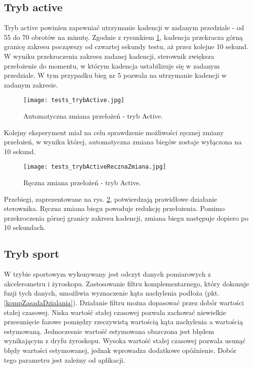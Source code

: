 \subsection{Tryb active}

Tryb active powinien zapewniać utrzymanie kadencji w zadanym przedziale - od 55 do 70 obrotów na minutę. Zgodnie z rysunkiem \ref{fig:tests_active}, kadencja przekracza górną granicę zakresu począwszy od czwartej sekundy testu, aż przez kolejne 10 sekund. W wyniku przekroczenia zakresu zadanej kadencji, sterownik zwiększa przełożenie do momentu, w którym kadencja ustabilizuje się w zadanym przedziale. W tym przypadku bieg nr 5 pozwala na utrzymanie kadencji w zadanym zakresie.
\begin{figure}[h]
    \centering
    \texttt{[image: tests\_trybActive.jpg]}
    \caption{Automatyczna zmiana przełożeń - tryb Active.}
    \label{fig:tests_active}
\end{figure}

Kolejny eksperyment miał na celu sprawdzenie możliwości ręcznej zmiany przełożeń, w wyniku której, automatyczna zmiana biegów zostaje wyłączona na 10 sekund.
\begin{figure}[h]
    \centering
    \texttt{[image: tests\_trybActiveRecznaZmiana.jpg]}
    \caption{Ręczna zmiana przełożeń - tryb Active.}
    \label{fig:tests_activeReczna}
\end{figure}

Przebiegi, zaprezentowane na rys. \ref{fig:tests_activeReczna}, potwierdzają prawidłowe działanie sterownika. Ręczna zmiana biegu powoduje redukcję przełożenia. Pomimo przekroczenia górnej granicy zakresu kadencji, zmiana biegu następuje dopiero po 10 sekundach.


\subsection{Tryb sport}
W trybie sportowym wykonywany jest odczyt danych pomiarowych z akcelerometru i żyroskopu. Zastosowanie filtru komplementarnego, który dokonuje fuzji tych danych, umożliwia wyznaczenie kąta nachylenia podłoża (pkt.\ref{kompZasadaDzialania}). Działanie filtru można dopasować przez dobór wartości stałej czasowej. Niska wartość stałej czasowej pozwala zachować niewielkie przesunięcie fazowe pomiędzy rzeczywistą wartością kąta nachylenia a wartością estymowaną. Jednoczesnie wartość estymowana obarczona jest błędem wynikającym z dryfu żyroskopu. Wysoka wartość stałej czasowej pozwala usunąć błędy wartości estymowanej, jednak wprowadza dodatkowe opóźnienie. Dobór tego parametru jest zależny od aplikacji.

